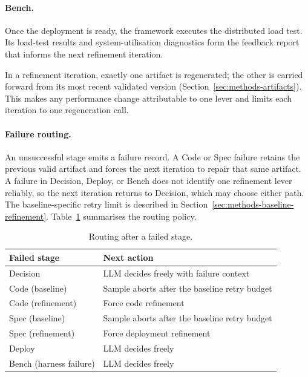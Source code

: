 \paragraph{Bench.}
Once the deployment is ready, the framework executes the distributed load test.
Its load-test results and system-utilisation diagnostics form the feedback
report that informs the next refinement iteration.

\medskip

In a refinement iteration, exactly one artifact is regenerated; the other is
carried forward from its most recent validated version
(Section~\ref{sec:methods-artifacts}). This makes any performance change
attributable to one lever and limits each iteration to one regeneration call.

\paragraph{Failure routing.}
An unsuccessful stage emits a failure record. A Code or Spec failure retains
the previous valid artifact and forces the next iteration to repair that same
artifact. A failure in Decision, Deploy, or Bench does not identify one
refinement lever reliably, so the next iteration returns to Decision, which
may choose either path. The baseline-specific retry limit is described in
Section~\ref{sec:methods-baseline-refinement}. Table~\ref{tab:failure-routing}
summarises the routing policy.
\label{sec:methods-failure}

\begin{table}[htbp]
  \centering
  \caption{Routing after a failed stage.}
  \label{tab:failure-routing}
  \small
  \begin{tabular}{@{}ll@{}}
    \toprule
    \textbf{Failed stage} & \textbf{Next action} \\
    \midrule
    Decision & LLM decides freely with failure context \\
    Code (baseline) & Sample aborts after the baseline retry budget \\
    Code (refinement) & Force code refinement \\
    Spec (baseline) & Sample aborts after the baseline retry budget \\
    Spec (refinement) & Force deployment refinement \\
    Deploy & LLM decides freely \\
    Bench (harness failure) & LLM decides freely \\
    \bottomrule
  \end{tabular}
\end{table}

